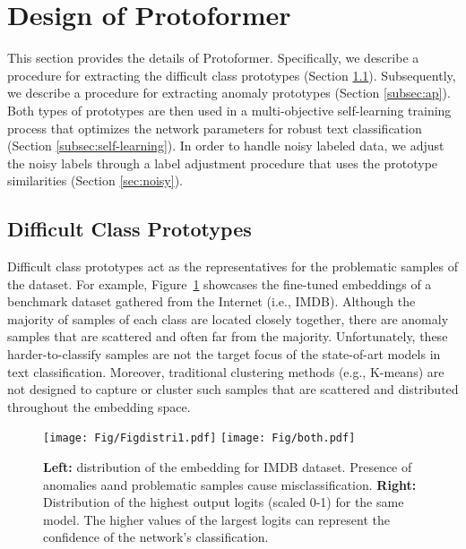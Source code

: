\documentclass[letterpaper]{article} \usepackage{aaai22}  \usepackage{times}  \usepackage{helvet}  \usepackage{courier}  \usepackage{amsmath,amssymb}
\begin{document}
 \section{Design of Protoformer}
\vspace{-2mm}
\label{section-methodology}
This section provides the details of Protoformer. Specifically, we describe a procedure for extracting the difficult class prototypes (Section \ref{subsec:cp}). Subsequently, we describe a procedure for extracting anomaly prototypes (Section \ref{subsec:ap}). Both types of prototypes are then used in a multi-objective self-learning training process that optimizes the network parameters for robust text classification (Section \ref{subsec:self-learning}).
In order to handle noisy labeled data, we adjust the noisy labels through a label adjustment procedure that uses the prototype similarities (Section \ref{sec:noisy}). 

\subsection{Difficult Class Prototypes}
\label{subsec:cp}
Difficult class prototypes act as the representatives for the problematic samples of the dataset. For example, Figure~\ref{fig:accuracy_improve} showcases the fine-tuned embeddings of a benchmark dataset gathered from the Internet (i.e., IMDB). Although the majority of samples of each class are located closely together, there are anomaly samples that are scattered and often far from the majority. Unfortunately, these harder-to-classify samples are not the target focus of the state-of-art models in text classification. 
Moreover, traditional clustering methods (e.g., K-means) are not designed to capture or cluster such samples that are scattered and distributed throughout the embedding space. 

\begin{figure}[!t]\centering
 {{\texttt{[image: Fig/Figdistri1.pdf]}}}\qquad
 {{\texttt{[image: Fig/both.pdf]} }}\caption{\textbf{Left:} distribution of the embedding for IMDB dataset. Presence of anomalies aand problematic samples cause misclassification. \textbf{Right:} Distribution of the highest output logits (scaled 0-1) for the same model. 
 The higher values of the largest logits can represent the confidence of the network's classification.}
 \label{fig:accuracy_improve}
 \vspace{-5mm}

\end{figure}
\end{document}
